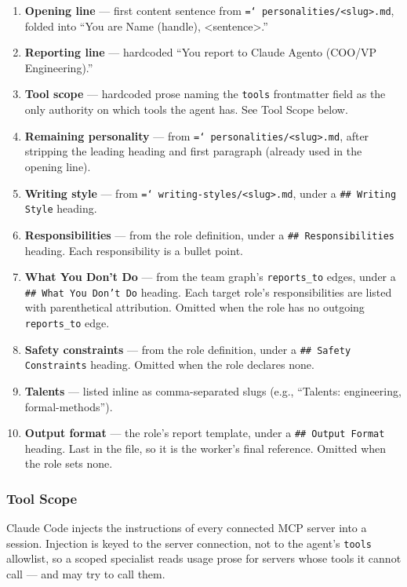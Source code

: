 \documentclass[a4paper,10pt]{article}
\newcommand{\fpath}[1]{\texttt{\hyphenchar\font=`\/ #1}}
\newcommand{\field}[1]{\texttt{#1}}
\begin{document}
\begin{enumerate}
  \item \textbf{Opening line} --- first content sentence from
    \fpath{personalities/<slug>.md}, folded into
    ``You are Name (handle), <sentence>.''
  \item \textbf{Reporting line} --- hardcoded
    ``You report to Claude Agento (COO/VP Engineering).''
  \item \textbf{Tool scope} --- hardcoded prose naming the
    \field{tools} frontmatter field as the only authority on which
    tools the agent has. See Tool Scope below.
  \item \textbf{Remaining personality} --- from
    \fpath{personalities/<slug>.md}, after stripping the leading
    heading and first paragraph (already used in the opening line).
  \item \textbf{Writing style} --- from
    \fpath{writing-styles/<slug>.md}, under a \texttt{\#\# Writing
    Style} heading.
  \item \textbf{Responsibilities} --- from the role definition, under
    a \texttt{\#\# Responsibilities} heading. Each responsibility is
    a bullet point.
  \item \textbf{What You Don't Do} --- from the team graph's
    \field{reports\_to} edges, under a \texttt{\#\# What You Don't
    Do} heading. Each target role's responsibilities are listed with
    parenthetical attribution. Omitted when the role has no outgoing
    \field{reports\_to} edge.
  \item \textbf{Safety constraints} --- from the role definition,
    under a \texttt{\#\# Safety Constraints} heading. Omitted when
    the role declares none.
  \item \textbf{Talents} --- listed inline as comma-separated slugs
    (e.g., ``Talents: engineering, formal-methods'').
  \item \textbf{Output format} --- the role's report template, under
    a \texttt{\#\# Output Format} heading. Last in the file, so it is
    the worker's final reference. Omitted when the role sets none.
\end{enumerate}

\subsubsection{Tool Scope}

Claude Code injects the instructions of every connected MCP server
into a session. Injection is keyed to the server connection, not to
the agent's \field{tools} allowlist, so a scoped specialist reads
usage prose for servers whose tools it cannot call --- and may try to
call them.
\end{document}
